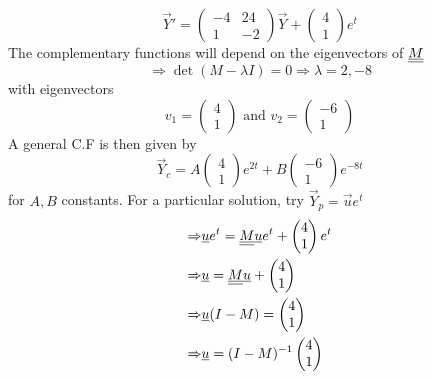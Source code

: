 \documentclass{article}
\begin{document}
\begin{eg}
    \[
        \vec Y' = \begin{pmatrix}
            -4 & 24 \\
            1 & -2
        \end{pmatrix} \vec Y + \begin{pmatrix}
            4 \\ 1
        \end{pmatrix} e^t
    \]
    The complementary functions will depend on the eigenvectors of $\underline{\underline{M}}$
    \[
        \Rightarrow \det(M - \lambda I) = 0 \Rightarrow \lambda = 2, -8
    \]
    with eigenvectors
    \[
        v_1 = \begin{pmatrix}
            4 \\ 1
        \end{pmatrix} \text{ and }
        v_2 = \begin{pmatrix}
            -6 \\ 1
        \end{pmatrix}
    \]
    A general C.F is then given by
    \[
        \vec Y_c = A \begin{pmatrix}
            4 \\ 1
        \end{pmatrix}e^{2t}
        + B \begin{pmatrix}
            -6 \\ 1
        \end{pmatrix}e^{-8t}
    \]
    for $A, B$ constants.
    For a particular solution, try $\vec Y_p = \vec u e^t$
    \begin{align*}
        \Rightarrow& \underline{u} e^t = \underline{\underline{M}} \underline{u} e^t + \begin{pmatrix}
            4 \\ 1
        \end{pmatrix} e^t \\
        \Rightarrow& \underline{u} = \underline{\underline{M}} \underline{u} + \begin{pmatrix}
            4 \\ 1
        \end{pmatrix} \\
        \Rightarrow& \underline{u} (I - M) = \begin{pmatrix}
            4 \\ 1
        \end{pmatrix} \\ 
        \Rightarrow& \underline{u} = (I - M)^{-1} \begin{pmatrix}
            4 \\ 1

\end{pmatrix}
\end{align*}
\end{eg}
\end{document}

